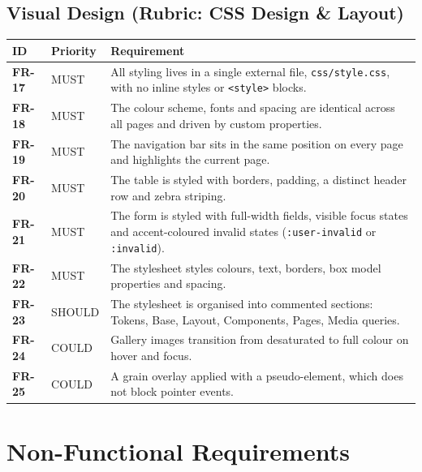 \documentclass[11pt,a4paper]{article}
\newcommand{\req}[3]{\textbf{\color{accent}#1} & #2 & #3 \\}
\begin{document}
\subsection{Visual Design (Rubric: CSS Design \& Layout)}
\begin{longtable}{@{}p{1.6cm}p{1.6cm}p{12.3cm}@{}}
\toprule
\textbf{ID} & \textbf{Priority} & \textbf{Requirement} \\
\midrule
\endhead
\req{FR-17}{MUST}{All styling lives in a single external file, \texttt{css/style.css}, with no inline styles or \texttt{<style>} blocks.}
\req{FR-18}{MUST}{The colour scheme, fonts and spacing are identical across all pages and driven by custom properties.}
\req{FR-19}{MUST}{The navigation bar sits in the same position on every page and highlights the current page.}
\req{FR-20}{MUST}{The table is styled with borders, padding, a distinct header row and zebra striping.}
\req{FR-21}{MUST}{The form is styled with full-width fields, visible focus states and accent-coloured invalid states (\texttt{:user-invalid} or \texttt{:invalid}).}
\req{FR-22}{MUST}{The stylesheet styles colours, text, borders, box model properties and spacing.}
\req{FR-23}{SHOULD}{The stylesheet is organised into commented sections: Tokens, Base, Layout, Components, Pages, Media queries.}
\req{FR-24}{COULD}{Gallery images transition from desaturated to full colour on hover and focus.}
\req{FR-25}{COULD}{A grain overlay applied with a pseudo-element, which does not block pointer events.}
\bottomrule
\end{longtable}

\section{Non-Functional Requirements}
\end{document}
